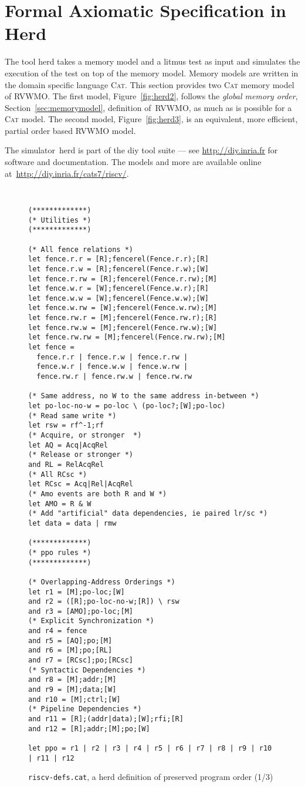 \clearpage
\section{Formal Axiomatic Specification in Herd}

The tool \textsf{herd} takes a memory model and a litmus test as input and simulates the execution of the test on top of the memory model. Memory models are written in the domain specific language \textsc{Cat}. This section provides two \textsc{Cat} memory model of RVWMO. The first model, Figure~\ref{fig:herd2}, follows the \emph{global memory order}, Section~\ref{sec:memorymodel}, definition of~RVWMO, as much as is possible for a \textsc{Cat} model. The second model, Figure~\ref{fig:herd3}, is an equivalent, more efficient, partial order based RVWMO model.

The simulator~\textsf{herd} is part of the \textsf{diy} tool suite --- see \url{http://diy.inria.fr} for software and documentation. The models and more are available online at~\url{http://diy.inria.fr/cats7/riscv/}.

\begin{figure}[h!]
  {
  \tt\bfseries\centering\footnotesize
  \begin{lstlisting}
(*************)
(* Utilities *)
(*************)

(* All fence relations *)
let fence.r.r = [R];fencerel(Fence.r.r);[R]
let fence.r.w = [R];fencerel(Fence.r.w);[W]
let fence.r.rw = [R];fencerel(Fence.r.rw);[M]
let fence.w.r = [W];fencerel(Fence.w.r);[R]
let fence.w.w = [W];fencerel(Fence.w.w);[W]
let fence.w.rw = [W];fencerel(Fence.w.rw);[M]
let fence.rw.r = [M];fencerel(Fence.rw.r);[R]
let fence.rw.w = [M];fencerel(Fence.rw.w);[W]
let fence.rw.rw = [M];fencerel(Fence.rw.rw);[M]
let fence = 
  fence.r.r | fence.r.w | fence.r.rw |
  fence.w.r | fence.w.w | fence.w.rw |
  fence.rw.r | fence.rw.w | fence.rw.rw

(* Same address, no W to the same address in-between *)
let po-loc-no-w = po-loc \ (po-loc?;[W];po-loc)
(* Read same write *)
let rsw = rf^-1;rf
(* Acquire, or stronger  *)
let AQ = Acq|AcqRel
(* Release or stronger *)
and RL = RelAcqRel
(* All RCsc *)
let RCsc = Acq|Rel|AcqRel
(* Amo events are both R and W *)
let AMO = R & W
(* Add "artificial" data dependencies, ie paired lr/sc *)
let data = data | rmw

(*************)
(* ppo rules *)
(*************)

(* Overlapping-Address Orderings *)
let r1 = [M];po-loc;[W]
and r2 = ([R];po-loc-no-w;[R]) \ rsw
and r3 = [AMO];po-loc;[M]
(* Explicit Synchronization *)
and r4 = fence
and r5 = [AQ];po;[M]
and r6 = [M];po;[RL]
and r7 = [RCsc];po;[RCsc]
(* Syntactic Dependencies *)
and r8 = [M];addr;[M]
and r9 = [M];data;[W]
and r10 = [M];ctrl;[W]
(* Pipeline Dependencies *)
and r11 = [R];(addr|data);[W];rfi;[R]
and r12 = [R];addr;[M];po;[W]

let ppo = r1 | r2 | r3 | r4 | r5 | r6 | r7 | r8 | r9 | r10 | r11 | r12
\end{lstlisting}
  }
  \caption{{\tt riscv-defs.cat}, a herd definition of preserved program order (1/3)}
  \label{fig:herd1}
\end{figure}

